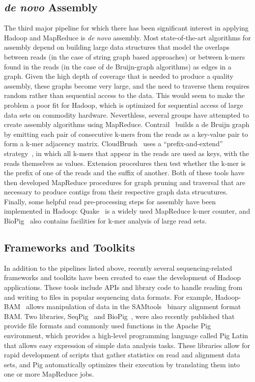 \subsection{\emph{de novo} Assembly}

The third major pipeline for which there has been significant interest in applying Hadoop and MapReduce is \emph{de novo} assembly. Most state-of-the-art algorithms for assembly depend on building large data structures that model the overlaps between reads (in the case of string graph based approaches) or between k-mers found in the reads (in the case of de Bruijn-graph algorithms) as edges in a graph. Given the high depth of coverage that is needed to produce a quality assembly, these graphs become very large, and the need to traverse them requires random rather than sequential access to the data. This would seem to make the problem a poor fit for Hadoop, which is optimized for sequential access of large data sets on commodity hardware. Neverthless, several groups have attempted to create assembly algorithms using MapReduce. Contrail~\cite{schatz2010novo} builds a de Bruijn graph by emitting each pair of consecutive k-mers from the reads as a key-value pair to form a k-mer adjacency matrix. CloudBrush~\cite{Chang:2012hd} uses a ``prefix-and-extend'' strategy~\cite{10.1109/CLOUD.2012.123}, in which all k-mers that appear in the reads are used as keys, with the reads themselves as values. Extension procedures then test whether the k-mer is the prefix of one of the reads and the suffix of another. Both of these tools have then developed MapReduce procedures for graph pruning and traversal that are necessary to produce contigs from their respective graph data strucutures. Finally, some helpful read pre-processing steps for assembly have been implemented in Hadoop: Quake~\cite{Kelley:2010kg} is a widely used MapReduce k-mer counter, and BioPig~\cite{Nordberg:2013ka} also contains facilities for k-mer analysis of large read sets.

\subsection{Frameworks and Toolkits}

In addition to the pipelines listed above, recently several sequencing-related frameworks and toolkits have been created to ease the development of Hadoop applications. These tools include APIs and library code to handle reading from and writing to files in popular sequencing data formats. For example, Hadoop-BAM~\cite{Niemenmaa:2012hu} allows manipulation of data in the SAMtools~\cite{Li:2009vz} binary alignment format BAM. Two libraries, SeqPig~\cite{Schumacher:2013kh} and BioPig~\cite{Nordberg:2013ka}, were also recently published that provide file formats and commonly used functions in the Apache Pig~\cite{pig} environment, which provides a high-level programming language called Pig Latin that allows easy expression of simple data analysis tasks. These libraries allow for rapid development of scripts that gather statistics on read and alignment data sets, and Pig automatically optimizes their execution by translating them into one or more MapReduce jobs. 

